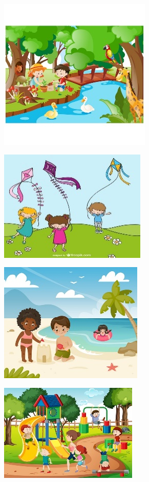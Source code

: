 \begin{escolha}
\begin{figure}[htpb!]
\centering
\item \includegraphics[width=.5\textwidth]{media/image154.jpeg}
\end{figure}

\begin{figure}[htpb!]
\centering
\item \includegraphics[width=.5\textwidth]{media/image155.jpeg}
\end{figure}

\begin{figure}[htpb!]
\centering
\item \includegraphics[width=.5\textwidth]{media/image156.jpeg}
\end{figure}

\begin{figure}[htpb!]
\centering
\item \includegraphics[width=.5\textwidth]{media/image157.jpeg}
\end{figure}
\end{escolha}

